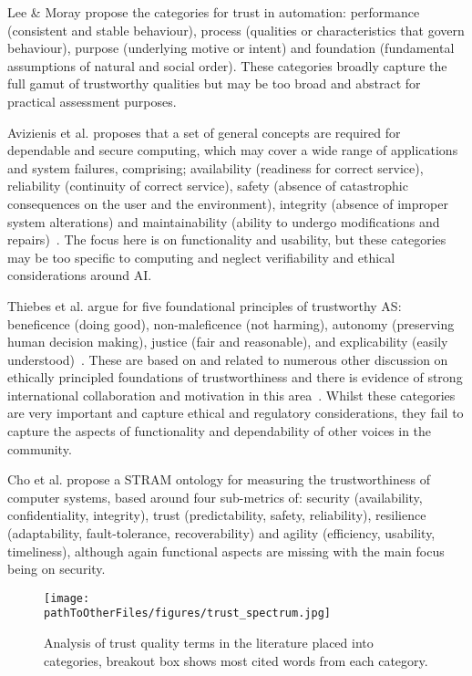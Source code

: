 Lee \& Moray propose the categories for trust in automation: performance (consistent and stable behaviour), process (qualities or characteristics that govern behaviour), purpose (underlying motive or intent) and foundation (fundamental assumptions of natural and social order). These categories broadly capture the full gamut of trustworthy qualities but may be too broad and abstract for practical assessment purposes. 

Avizienis et al. proposes that a set of general concepts are required for dependable and secure computing, which may cover a wide range of applications and system failures, comprising; availability (readiness for correct service), reliability (continuity of correct service), safety (absence of catastrophic consequences on the user and the environment), integrity (absence of improper system alterations) and maintainability (ability to undergo modifications and repairs)~\cite{avizienis2004basic}. The focus here is on functionality and usability, but these categories may be too specific to computing and neglect verifiability and ethical considerations around AI.

Thiebes et al. argue for five foundational principles of trustworthy AS: beneficence (doing good), non-maleficence (not harming), autonomy (preserving human decision making), justice (fair and reasonable), and explicability (easily understood)~\cite{Thiebes2021}. These are based on and related to numerous other discussion on ethically principled foundations of trustworthiness and there is evidence of strong international collaboration and motivation in this area~\cite{Floridi2018,jobin2019global}. Whilst these categories are very important and capture ethical and regulatory considerations, they fail to capture the aspects of functionality and dependability of other voices in the community.

Cho et al. propose a STRAM ontology for measuring the trustworthiness of computer systems, based around four sub-metrics of: security (availability, confidentiality, integrity), trust (predictability, safety, reliability), resilience (adaptability, fault-tolerance, recoverability) and agility (efficiency, usability, timeliness), although again functional aspects are missing with the main focus being on security.

\begin{figure*}[]
    \centering
    \texttt{[image: \\pathToOtherFiles/figures/trust\_spectrum.jpg]}
    \caption{Analysis of trust quality terms in the literature placed into categories, breakout box shows most cited words from each category.}
    \label{fig:trust_spectrum}
\end{figure*}

